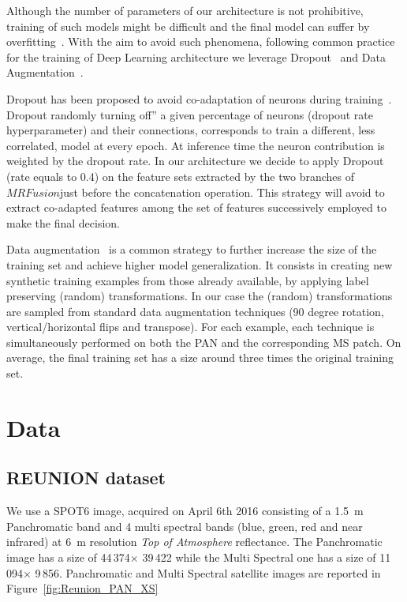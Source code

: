\documentclass[journal]{IEEEtran}
\newcommand{\method}{$MRFusion$}
\begin{document}
Although the number of parameters of our architecture is not prohibitive, training of such models might be difficult and the final model can suffer by overfitting~\cite{DahlSH13}. With the aim to avoid such phenomena, following common practice for the training of Deep Learning architecture we leverage Dropout~\cite{DahlSH13} and Data Augmentation~\cite{abs-1712-04621}.

Dropout has been proposed to avoid co-adaptation of neurons during training~\cite{DahlSH13}. Dropout randomly turning off” a given percentage of neurons (dropout rate hyperparameter) and their connections, corresponds to train a different, less correlated, model at every epoch. At inference time the neuron contribution is weighted by the dropout rate.
In our architecture we decide to apply Dropout (rate equals to 0.4) on the feature sets extracted by the two branches of \method just before the concatenation operation. This strategy will avoid to extract co-adapted features among the set of features successively employed to make the final decision.

Data augmentation~\cite{abs-1712-04621} is a common strategy to further increase the size of the training set and achieve higher model generalization. It consists in creating new synthetic training examples from those already available, by applying label preserving (random) transformations. In our case the (random) transformations are sampled from standard data augmentation techniques (90 degree rotation, vertical/horizontal flips and transpose). For each example, each technique is simultaneously performed on both the PAN and the corresponding MS patch. On average, the final training set has a size around three times the original training set.


\section{Data}
\label{sec:data}
\label{sec:data}\subsection{REUNION dataset}

We use a SPOT6 image, acquired on April 6th 2016 consisting of a 1.5~m Panchromatic band and 4 multi spectral bands (blue, green, red and near infrared) at 6~m resolution \textit{Top of Atmosphere} reflectance.
The Panchromatic image has a size of 44\,374$\times$ 39\,422 while the Multi Spectral one has a size of
11\,094$\times$ 9\,856. %
Panchromatic and Multi Spectral satellite images are reported in Figure~\ref{fig:Reunion_PAN_XS}%
\end{document}
